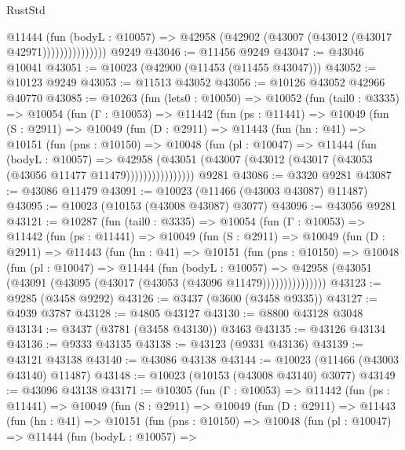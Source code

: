 \begin{lexlean}{RustStd}
\begin{coremodule}
                      @11444
                        (fun (bodyL : @10057) =>
                        @42958 (@42902 (@43007 (@43012 (@43017 @42971)))))))))))))))
    @9249
@43046 := @11456 @9249
@43047 := @43046 @10041
@43051 := @10023 (@42900 (@11453 (@11455 @43047)))
@43052 := @10123 @9249
@43053 := @11513 @43052
@43056 := @10126 @43052 @42966 @40770
@43085 := @10263
    (fun (lets0 : @10050) =>
    @10052
      (fun (tail0 : @3335) =>
      @10054
        (fun (Γ : @10053) =>
        @11442
          (fun (ps : @11441) =>
          @10049
            (fun (S : @2911) =>
            @10049
              (fun (D : @2911) =>
              @11443
                (fun (hn : @41) =>
                @10151
                  (fun (pns : @10150) =>
                  @10048
                    (fun (pl : @10047) =>
                    @11444
                      (fun (bodyL : @10057) =>
                      @42958
                        (@43051
                          (@43007 (@43012 (@43017 (@43053 (@43056 @11477 @11479))))))))))))))))
    @9281
@43086 := @3320 @9281
@43087 := @43086 @11479
@43091 := @10023 (@11466 (@43003 @43087) @11487)
@43095 := @10023 (@10153 (@43008 @43087) @3077)
@43096 := @43056 @9281
@43121 := @10287
    (fun (tail0 : @3335) =>
    @10054
      (fun (Γ : @10053) =>
      @11442
        (fun (ps : @11441) =>
        @10049
          (fun (S : @2911) =>
          @10049
            (fun (D : @2911) =>
            @11443
              (fun (hn : @41) =>
              @10151
                (fun (pns : @10150) =>
                @10048
                  (fun (pl : @10047) =>
                  @11444
                    (fun (bodyL : @10057) =>
                    @42958 (@43051 (@43091 (@43095 (@43017 (@43053 (@43096 @11479)))))))))))))))
@43123 := @9285 (@3458 @9292)
@43126 := @3437 (@3600 (@3458 @9335))
@43127 := @4939 @3787
@43128 := @4805 @43127
@43130 := @8800 @43128 @3048
@43134 := @3437 (@3781 (@3458 @43130)) @3463
@43135 := @43126 @43134
@43136 := @9333 @43135
@43138 := @43123 (@9331 @43136)
@43139 := @43121 @43138
@43140 := @43086 @43138
@43144 := @10023 (@11466 (@43003 @43140) @11487)
@43148 := @10023 (@10153 (@43008 @43140) @3077)
@43149 := @43096 @43138
@43171 := @10305
    (fun (Γ : @10053) =>
    @11442
      (fun (ps : @11441) =>
      @10049
        (fun (S : @2911) =>
        @10049
          (fun (D : @2911) =>
          @11443
            (fun (hn : @41) =>
            @10151
              (fun (pns : @10150) =>
              @10048
                (fun (pl : @10047) =>
                @11444
                  (fun (bodyL : @10057) =>

\end{coremodule}
\end{lexlean}
